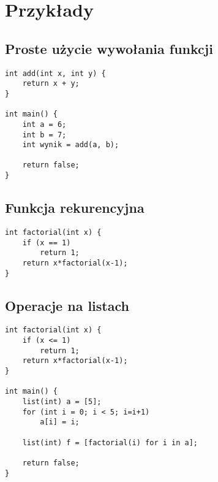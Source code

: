 \documentclass{article}
\begin{document}
\newpage
\section{Przykłady}
\subsection{Proste użycie wywołania funkcji}
\begin{lstlisting}[tabsize=2]
int add(int x, int y) {
	return x + y;
}

int main() {
	int a = 6;
	int b = 7;
	int wynik = add(a, b);

	return false;
}
\end{lstlisting}

\subsection{Funkcja rekurencyjna}
\begin{lstlisting}[tabsize=2]
int factorial(int x) {
	if (x == 1)
		return 1;
	return x*factorial(x-1);
}
\end{lstlisting}

\subsection{Operacje na listach}
\begin{lstlisting}[tabsize=2]
int factorial(int x) {
	if (x <= 1)
		return 1;
	return x*factorial(x-1);
}

int main() {
	list(int) a = [5];
	for (int i = 0; i < 5; i=i+1)
		a[i] = i;

	list(int) f = [factorial(i) for i in a];

	return false;
}

\end{lstlisting}
\end{document}
